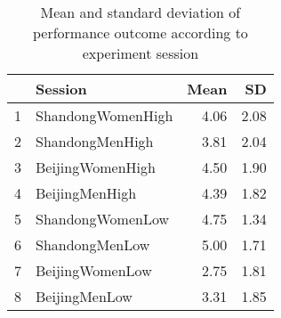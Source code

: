 \begin{table}[ht]
\centering
\begin{tabular}{rlrr}
  \hline
 & Session & Mean & SD \\ 
  \hline
1 & ShandongWomenHigh & 4.06 & 2.08 \\ 
  2 & ShandongMenHigh & 3.81 & 2.04 \\ 
  3 & BeijingWomenHigh & 4.50 & 1.90 \\ 
  4 & BeijingMenHigh & 4.39 & 1.82 \\ 
  5 & ShandongWomenLow & 4.75 & 1.34 \\ 
  6 & ShandongMenLow & 5.00 & 1.71 \\ 
  7 & BeijingWomenLow & 2.75 & 1.81 \\ 
  8 & BeijingMenLow & 3.31 & 1.85 \\ 
   \hline
\end{tabular}
\caption{Mean and standard deviation of performance outcome according to experiment session} 
\label{tab:fullOutcomeAvgSdSession}
\end{table}
